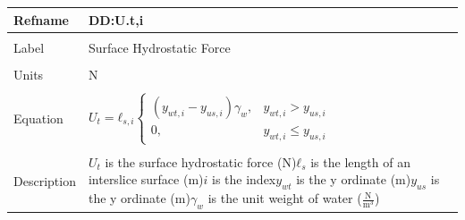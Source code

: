 \documentclass[12pt]{article}
\begin{document}
\noindent \begin{minipage}{\textwidth}
\begin{tabular}{p{} p{}}
\toprule \textbf{Refname} & \textbf{DD:U.t,i}
\label{DD:U.t,i}
\\ \midrule \\
Label & Surface Hydrostatic Force
\\ \midrule \\
Units & N
\\ \midrule \\
Equation & ${U_{t}}={ℓ_{s,i}} \begin{cases}
\left({y_{wt,i}}-{y_{us,i}}\right) {γ_{w}}, & {y_{wt,i}}>{y_{us,i}}\\
0, & {y_{wt,i}}\leq{}{y_{us,i}}
\end{cases}$
\\ \midrule \\
Description & ${U_{t}}$ is the surface hydrostatic force (N)\newline${ℓ_{s}}$ is the length of an interslice surface (m)\newline$i$ is the index\newline${y_{wt}}$ is the y ordinate (m)\newline${y_{us}}$ is the y ordinate (m)\newline${γ_{w}}$ is the unit weight of water ($\frac{\text{N}}{\text{m}^{3}}$)
\\ \bottomrule \end{tabular}
\end{minipage}\\
~\newline
\end{document}
